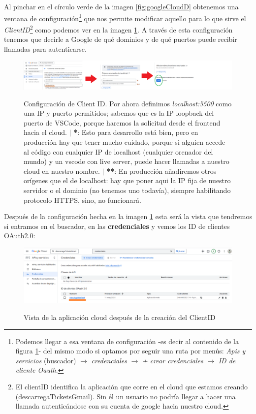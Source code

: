 \documentclass[a4paper,12pt]{report}
\begin{document}
	Al pinchar en el círculo verde de la imagen \ref{fig:googleCloudD} obtenemos una ventana de configuración\footnote{Podemos llegar a esa ventana de configuración -es decir al contenido de la figura \ref{fig:googleCloudE}- del mismo modo si optamos por seguir una ruta por menús: \textit{Apis y servicios} (buscador) $\rightarrow$ \textit{credenciales} $\rightarrow$ \textit{+ crear credenciales} $\rightarrow$ \textit{ID de cliente Oauth}.} que nos permite modificar aquello para lo que sirve el \textit{ClientID}\footnote{El clientID identifica la aplicación que corre en el cloud que estamos creando (descarregaTicketsGmail). Sin él un usuario no podría llegar a hacer una llamada autenticándose con su cuenta de google hacia nuestro cloud.} como podemos ver en la imagen \ref{fig:googleCloudE}. A través de esta configuración tenemos que decirle a Google de qué dominios y de qué puertos puede recibir llamadas para autenticarse.
	
	
	\FloatBarrier
	\setlength{\belowcaptionskip}{3pt}
	\begin{figure}[H]
		\centering
		\caption{Configuración de Client ID. Por ahora definimos \textit{localhost:5500} como una IP y puerto permitidos; sabemos que es la IP loopback del puerto de VSCode, porque haremos la solicitud desde el frontend hacia el cloud. $|$ \textbf{*}: Esto para desarrollo está bien, pero en producción hay que tener mucho cuidado, porque si alguien accede al código con cualquier IP de localhost (cualquier orenador del mundo) y un vscode con live server, puede hacer llamadas a nuestro cloud en nuestro nombre.  $|$ \textbf{**}: En producción añadiremos otros orígenes que el de localhost: hay que poner aqui la IP fija de nuestro servidor o el dominio (no tenemos uno todavía), siempre habilitando protocolo HTTPS, sino, no funcionará.}
		\includegraphics[width=1\linewidth]{img/googleCloudE.png}
		\label{fig:googleCloudE}
	\end{figure}
	\FloatBarrier
	
	
	
	Después de la configuración hecha en la imagen \ref{fig:googleCloudE} esta será la vista que tendremos si entramos en el buscador, en las \textbf{credenciales} y vemos los ID de clientes OAuth2.0:
	
	\FloatBarrier
	\setlength{\belowcaptionskip}{3pt}
	\begin{figure}[H]
		\centering
		\caption{Vista de la aplicación cloud después de la creación del ClientID}
		\includegraphics[width=1\linewidth]{img/googleCloudF}
		\label{fig:googleCloudF}
	\end{figure}
	\FloatBarrier
	
\end{document}
